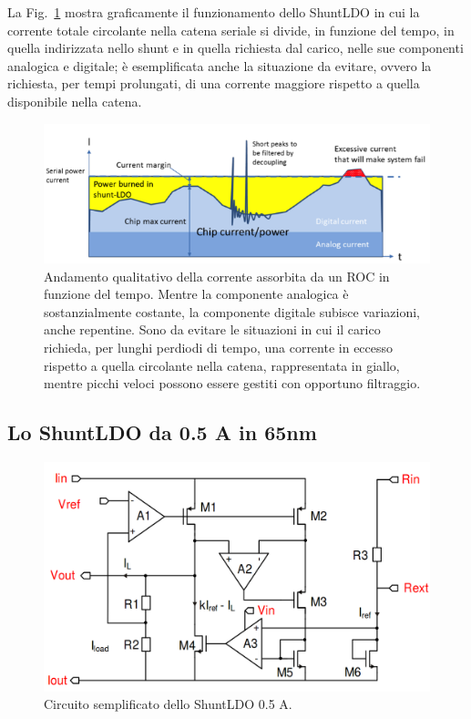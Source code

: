 La Fig.~\ref{SLDOprinciple} mostra graficamente il funzionamento dello ShuntLDO in cui la corrente totale circolante nella catena seriale si divide, in funzione del tempo, in quella indirizzata nello shunt e in quella richiesta dal carico, nelle sue componenti analogica e digitale; \`e esemplificata anche la situazione da evitare, ovvero la richiesta, per tempi prolungati, di una corrente maggiore rispetto a quella disponibile nella catena.
\begin{figure}[!htbp]
\centering
\includegraphics[scale=.5]{Immagini/ShuntRegulatorPrinciple}
\caption{Andamento qualitativo della corrente assorbita da un ROC in funzione del tempo. Mentre la componente analogica \`e sostanzialmente costante, la componente digitale subisce variazioni, anche repentine. Sono da evitare le situazioni in cui il carico richieda, per lunghi perdiodi di tempo, una corrente in eccesso rispetto a quella circolante nella catena, rappresentata in giallo, mentre picchi veloci possono essere gestiti con opportuno filtraggio.}
\label{SLDOprinciple}
\end{figure}

\subsection{Lo ShuntLDO da 0.5 A in 65nm}

 
\begin{figure}[!htbp]
\centering
\includegraphics[scale=.3]{Immagini/SLDO5A}
\caption{Circuito semplificato dello ShuntLDO 0.5 A.}
\label{SLDO5A}
\end{figure}

